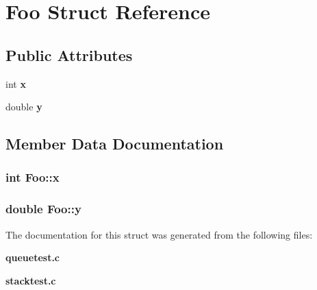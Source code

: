 \section{Foo Struct Reference}
\label{structFoo}
\subsection*{Public Attributes}
\begin{CompactItemize}
\item 
int \bf{x}
\item 
double \bf{y}
\end{CompactItemize}


\subsection{Member Data Documentation}
\subsubsection{\setlength{\rightskip}{0pt plus 5cm}int \bf{Foo::x}}\label{structFoo_16eddb7296c37d91335845d7b847c6b3}


\subsubsection{\setlength{\rightskip}{0pt plus 5cm}double \bf{Foo::y}}\label{structFoo_9b2c09554b5b9ea744e287278243d5cb}




The documentation for this struct was generated from the following files:\begin{CompactItemize}
\item 
\bf{queuetest.c}\item 
\bf{stacktest.c}\end{CompactItemize}
